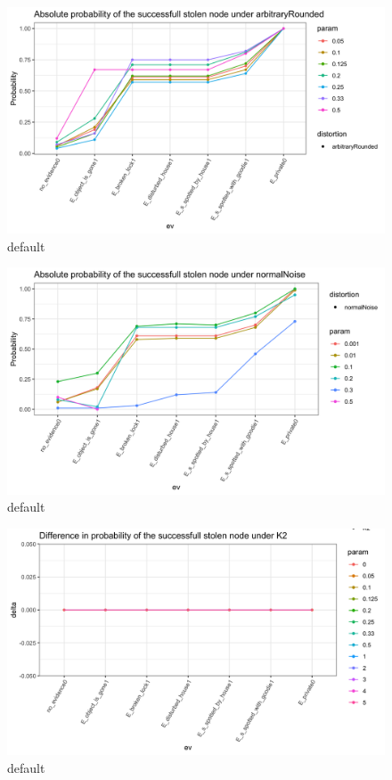 \documentclass[11pt]{amsart}
\begin{document}
\begin{figure}[htbp]
\centering
\begin{center}
\includegraphics[width=\linewidth]{images/arbitraryRoundedabsolute.png}
\caption{default}
\label{default}
\end{center}
\end{figure}
\begin{figure}[htbp]
\centering
\begin{center}
\includegraphics[width=\linewidth]{images/normalNoiseabsolute.png}
\caption{default}
\label{default}
\end{center}
\end{figure}


\begin{figure}[htbp]
\begin{center}
\includegraphics[width=\linewidth]{images/K2delta.png}
\caption{default}
\label{default}
\end{center}
\end{figure}
\end{document}
